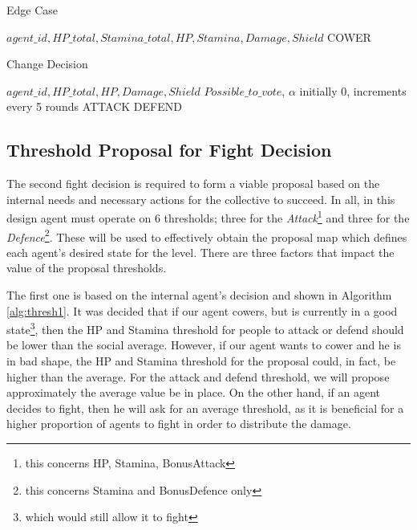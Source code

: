 \begin{algorithm}[htb]
\caption{Edge Case}\label{alg:9}
\begin{algorithmic} 
\scriptsize
\Require $agent\_id, HP\_total,Stamina\_total, HP, Stamina, Damage, Shield$
\Return COWER
\EndIf
\end{algorithmic}
\end{algorithm}

\begin{algorithm}[htb]
\caption{Change Decision}\label{alg:10}
\begin{algorithmic} 
\scriptsize
\Require $agent\_id, HP\_total, HP, Damage, Shield$
\Ensure $Possible\_to\_vote$, $\alpha$ initially 0, increments every 5 rounds
\Return ATTACK
\Return DEFEND
\EndIf
\EndIf
\EndIf
\end{algorithmic}
\end{algorithm}

\pagebreak

\subsection{Threshold Proposal for Fight Decision}
    
The second fight decision is required to form a viable proposal based on the internal needs and necessary actions for the collective to succeed. In all, in this design agent must operate on 6 thresholds; three for the \textit{Attack}\footnote{this concerns HP, Stamina, BonusAttack} and three for the \textit{Defence}\footnote{this concerns Stamina and BonusDefence only}. These will be used to effectively obtain the proposal map which defines each agent's desired state for the level. There are three factors that impact the value of the proposal thresholds.
    
The first one is based on the internal agent's decision and shown in Algorithm \ref{alg:thresh1}. It was decided that if our agent cowers, but is currently in a good state\footnote{which would still allow it to fight}, then the HP and Stamina threshold for people to attack or defend should be lower than the social average. However, if our agent wants to cower and he is in bad shape, the HP and Stamina threshold for the proposal could, in fact, be higher than the average. For the attack and defend threshold, we will propose approximately the average value be in place. On the other hand, if an agent decides to fight, then he will ask for an average threshold, as it is beneficial for a higher proportion of agents to fight in order to distribute the damage.
 


